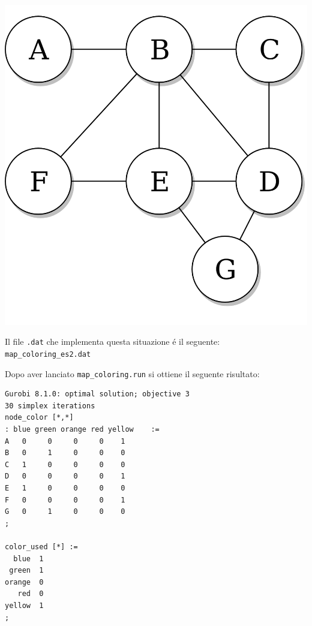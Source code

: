 \documentclass{article}
\begin{document}
\begin{center}
\includegraphics[scale=0.15]{non_complete_graph.png}
\end{center}

\pagebreak

Il file \texttt{.dat} che implementa questa situazione \'e il seguente:\\

\vspace{5mm}
\texttt{map\_coloring\_es2.dat}

\vspace{5mm}

Dopo aver lanciato \texttt{map\_coloring.run} si ottiene il seguente risultato:\\
\begin{verbatim}
Gurobi 8.1.0: optimal solution; objective 3
30 simplex iterations
node_color [*,*]
: blue green orange red yellow    :=
A   0     0     0     0    1
B   0     1     0     0    0
C   1     0     0     0    0
D   0     0     0     0    1
E   1     0     0     0    0
F   0     0     0     0    1
G   0     1     0     0    0
;

color_used [*] :=
  blue  1
 green  1
orange  0
   red  0
yellow  1
;
\end{verbatim}
\end{document}
